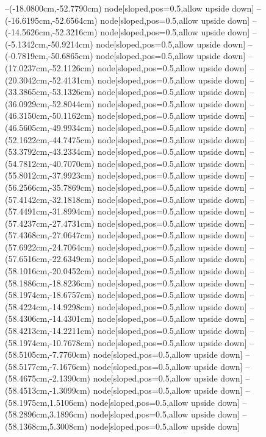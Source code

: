 --(-18.0800cm,-52.7790cm) node[sloped,pos=0.5,allow upside down]{\ArrowIn}
--(-16.6195cm,-52.6564cm) node[sloped,pos=0.5,allow upside down]{\ArrowIn}
--(-14.5626cm,-52.3216cm) node[sloped,pos=0.5,allow upside down]{\ArrowIn}
--(-5.1342cm,-50.9214cm) node[sloped,pos=0.5,allow upside down]{\ArrowIn}
--(-0.7819cm,-50.6865cm) node[sloped,pos=0.5,allow upside down]{\ArrowIn}
--(17.0237cm,-52.1126cm) node[sloped,pos=0.5,allow upside down]{\ArrowIn}
--(20.3042cm,-52.4131cm) node[sloped,pos=0.5,allow upside down]{\ArrowIn}
--(33.3865cm,-53.1326cm) node[sloped,pos=0.5,allow upside down]{\ArrowIn}
--(36.0929cm,-52.8044cm) node[sloped,pos=0.5,allow upside down]{\ArrowIn}
--(46.3150cm,-50.1162cm) node[sloped,pos=0.5,allow upside down]{\ArrowIn}
--(46.5605cm,-49.9934cm) node[sloped,pos=0.5,allow upside down]{\arrowIn}
--(52.1622cm,-44.7475cm) node[sloped,pos=0.5,allow upside down]{\ArrowIn}
--(53.3792cm,-43.2334cm) node[sloped,pos=0.5,allow upside down]{\ArrowIn}
--(54.7812cm,-40.7070cm) node[sloped,pos=0.5,allow upside down]{\ArrowIn}
--(55.8012cm,-37.9923cm) node[sloped,pos=0.5,allow upside down]{\ArrowIn}
--(56.2566cm,-35.7869cm) node[sloped,pos=0.5,allow upside down]{\ArrowIn}
--(57.4142cm,-32.1818cm) node[sloped,pos=0.5,allow upside down]{\ArrowIn}
--(57.4491cm,-31.8994cm) node[sloped,pos=0.5,allow upside down]{\arrowIn}
--(57.4237cm,-27.4731cm) node[sloped,pos=0.5,allow upside down]{\ArrowIn}
--(57.4368cm,-27.0647cm) node[sloped,pos=0.5,allow upside down]{\arrowIn}
--(57.6922cm,-24.7064cm) node[sloped,pos=0.5,allow upside down]{\ArrowIn}
--(57.6516cm,-22.6349cm) node[sloped,pos=0.5,allow upside down]{\ArrowIn}
--(58.1016cm,-20.0452cm) node[sloped,pos=0.5,allow upside down]{\ArrowIn}
--(58.1886cm,-18.8236cm) node[sloped,pos=0.5,allow upside down]{\ArrowIn}
--(58.1974cm,-18.6757cm) node[sloped,pos=0.5,allow upside down]{\arrowIn}
--(58.4224cm,-14.9298cm) node[sloped,pos=0.5,allow upside down]{\ArrowIn}
--(58.4306cm,-14.4301cm) node[sloped,pos=0.5,allow upside down]{\arrowIn}
--(58.4213cm,-14.2211cm) node[sloped,pos=0.5,allow upside down]{\arrowIn}
--(58.1974cm,-10.7678cm) node[sloped,pos=0.5,allow upside down]{\ArrowIn}
--(58.5105cm,-7.7760cm) node[sloped,pos=0.5,allow upside down]{\ArrowIn}
--(58.5177cm,-7.1676cm) node[sloped,pos=0.5,allow upside down]{\arrowIn}
--(58.4675cm,-2.1390cm) node[sloped,pos=0.5,allow upside down]{\ArrowIn}
--(58.4513cm,-1.3099cm) node[sloped,pos=0.5,allow upside down]{\arrowIn}
--(58.1975cm,1.5106cm) node[sloped,pos=0.5,allow upside down]{\ArrowIn}
--(58.2896cm,3.1896cm) node[sloped,pos=0.5,allow upside down]{\ArrowIn}
--(58.1368cm,5.3008cm) node[sloped,pos=0.5,allow upside down]{\ArrowIn}
